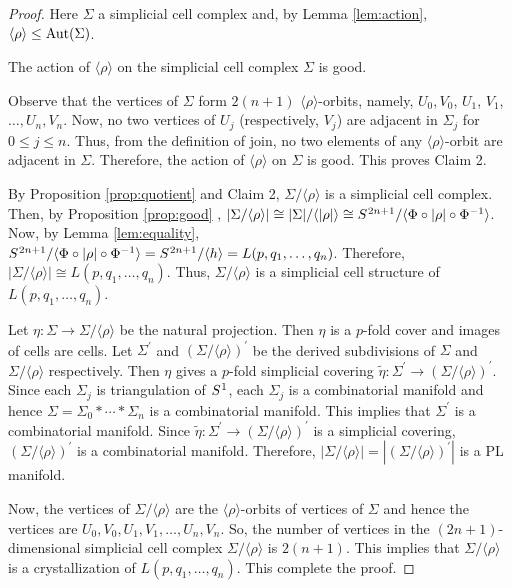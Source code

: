 \documentclass[12pt]{article}
\theoremstyle{theorem}
\theoremstyle{definition}
\begin{document}
\begin{proof}
Here  $\Sigma$ a simplicial cell complex and, by Lemma \ref{lem:action},  $\langle\rho \rangle \leq {\rm Aut}(\Sigma)$. 

\medskip 

 The action of $\langle\rho \rangle$ on the simplicial cell complex $\Sigma$ is good. 

\medskip

Observe that the vertices of $\Sigma$ form $2(n+1)$ $\langle\rho \rangle$-orbits, namely, $U_0, V_0$, $U_1$, $V_1$, $\dots, U_n, V_n$.  Now, no two vertices of $U_j$ (respectively, $V_j$) are adjacent in $\Sigma_j$ for $0\leq j\leq n$. Thus, from the definition of join, no two elements of any $\langle\rho \rangle$-orbit are adjacent in $\Sigma$. Therefore,  the action of $\langle\rho \rangle$ on $\Sigma$ is good. This proves Claim 2. 
 
 \medskip
 
By Proposition \ref{prop:quotient} and Claim 2, $\Sigma/\langle\rho \rangle$ is a simplicial cell complex. Then, by Proposition \ref{prop:good} , $|\Sigma/\langle\rho\rangle| \cong |\Sigma|/\langle|\rho|\rangle \cong S^{\hspace{.2mm}2n+1}/\langle \Phi\circ|\rho|\circ\Phi^{-1}\rangle$.  Now, by Lemma \ref{lem:equality}, $S^{\hspace{.2mm}2n+1}/\langle \Phi\circ|\rho|\circ\Phi^{-1}\rangle = S^{\hspace{.2mm}2n+1}/\langle h\rangle = L(p, q_1, \dots, q_n)$. Therefore, $|\Sigma/\langle\rho\rangle| \cong L(p, q_1, \dots, q_n)$. Thus, $\Sigma/\langle\rho \rangle$ is a simplicial cell structure of  $L(p, q_1, \dots, q_n)$. 

Let $\eta : \Sigma \to \Sigma/\langle\rho \rangle$ be the natural projection. Then $\eta$ is a $p$-fold cover and images of cells are cells. Let $\Sigma^{\prime}$  and $(\Sigma/\langle\rho \rangle)^{\prime}$ be the derived subdivisions of $\Sigma$  and $\Sigma/\langle\rho \rangle$ respectively. Then $\eta$ gives a $p$-fold simplicial covering $\tilde{\eta} : \Sigma^{\prime} \to (\Sigma/\langle\rho \rangle)^{\prime}$. Since each $\Sigma_j$ is triangulation of $S^{\hspace{.2mm}1}$, each $\Sigma_j$ is a combinatorial manifold and hence $\Sigma= \Sigma_0\ast \cdots\ast \Sigma_n$ is a combinatorial manifold. This implies that $\Sigma^{\prime}$ is a combinatorial manifold. Since $\tilde{\eta}: \Sigma^{\prime} \to (\Sigma/\langle\rho \rangle)^{\prime}$ is a simplicial covering, $(\Sigma/\langle\rho \rangle)^{\prime}$ is a combinatorial manifold. Therefore,  $ |\Sigma/\langle\rho \rangle| = |(\Sigma/\langle\rho \rangle)^{\prime}|$ is a PL manifold. 

Now, the vertices  of $\Sigma/\langle\rho \rangle$ are the $\langle\rho \rangle$-orbits of vertices of $\Sigma$ and hence the vertices are $U_0, V_0, U_1, V_1, \dots, U_n, V_n$. So, the number of vertices in the $(2n+1)$-dimensional simplicial cell complex $\Sigma/\langle\rho \rangle$ is $2(n+1)$. This implies that $\Sigma/\langle\rho \rangle$ is a crystallization of $L(p, q_1, \dots, q_n)$. This complete the proof. 
\end{proof}
\end{document}
